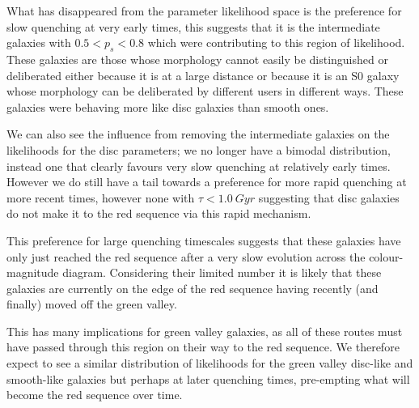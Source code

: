 \documentclass{mn2e}
\begin{document}
What has disappeared from the parameter likelihood space is the preference for slow quenching at very early times, this suggests that it is the intermediate galaxies with $0.5 < p_s < 0.8$ which were contributing to this region of likelihood. These galaxies are those whose morphology cannot easily be distinguished or deliberated either because it is at a large distance or because it is an S0 galaxy whose morphology can be deliberated by different users in different ways. These galaxies were behaving more like disc galaxies than smooth ones. 


We can also see the influence from removing the intermediate galaxies on the likelihoods for the disc parameters; we no longer have a bimodal distribution, instead one that clearly favours very slow quenching at relatively early times. However we do still have a tail towards a preference for more rapid quenching at more recent times, however none with $\tau < 1.0~Gyr$ suggesting that disc galaxies do not make it to the red sequence via this rapid mechanism.

This preference for large quenching timescales suggests that these galaxies have only just reached the red sequence after a very slow evolution across the colour-magnitude diagram. Considering their limited number it is likely that these galaxies are currently on the edge of the red sequence having recently (and finally) moved off the green valley.

This has many implications for green valley galaxies, as all of these routes must have passed through this region on their way to the red sequence. We therefore expect to see a similar distribution of likelihoods for the green valley disc-like and smooth-like galaxies but perhaps at later quenching times, pre-empting what will become the red sequence over time. 
\end{document}
